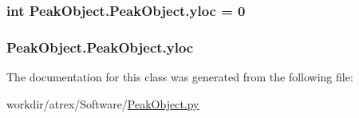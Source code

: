 \hypertarget{class_peak_object_1_1_peak_object_abebfb4985f9b0b73e6b1e20cb5a56f18}{
\subsubsection[{yloc}]{\setlength{\rightskip}{0pt plus 5cm}int Peak\-Object.\-Peak\-Object.\-yloc = 0\hspace{0.3cm}{\ttfamily [static]}}}\label{class_peak_object_1_1_peak_object_abebfb4985f9b0b73e6b1e20cb5a56f18}
\hypertarget{class_peak_object_1_1_peak_object_adc5441b9bde0d002725032741bce8a3a}{
\subsubsection[{yloc}]{\setlength{\rightskip}{0pt plus 5cm}Peak\-Object.\-Peak\-Object.\-yloc}}\label{class_peak_object_1_1_peak_object_adc5441b9bde0d002725032741bce8a3a}


The documentation for this class was generated from the following file\-:\begin{DoxyCompactItemize}
\item 
workdir/atrex/\-Software/\hyperlink{_peak_object_8py}{Peak\-Object.\-py}\end{DoxyCompactItemize}
